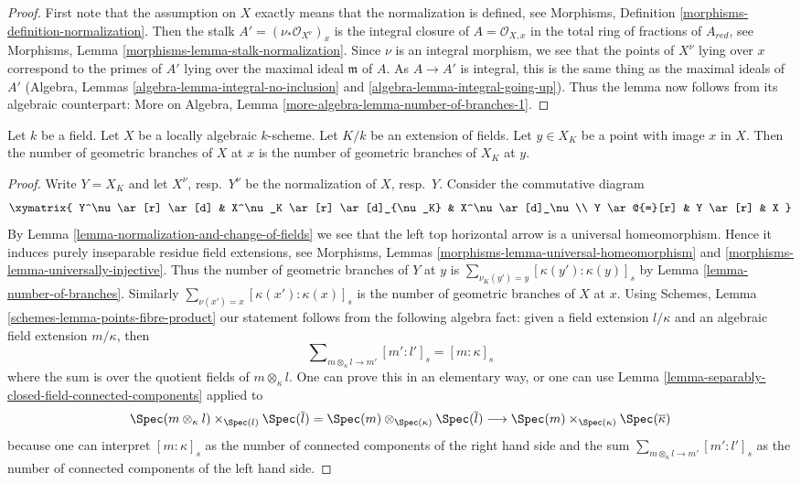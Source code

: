 \begin{proof}
First note that the assumption on $X$ exactly means that the
normalization is defined, see
Morphisms, Definition \ref{morphisms-definition-normalization}.
Then the stalk $A' = (\nu_*\mathcal{O}_{X^\nu})_x$ is the
integral closure of $A = \mathcal{O}_{X, x}$ in the total
ring of fractions of $A_{red}$, see
Morphisms, Lemma \ref{morphisms-lemma-stalk-normalization}.
Since $\nu$ is an integral morphism, we see that
the points of $X^\nu$ lying over $x$ correspond
to the primes of $A'$ lying over the maximal ideal $\mathfrak m$
of $A$. As $A \to A'$ is integral, this is the same thing as
the maximal ideals of $A'$
(Algebra, Lemmas \ref{algebra-lemma-integral-no-inclusion} and
\ref{algebra-lemma-integral-going-up}).
Thus the lemma now follows
from its algebraic counterpart:
More on Algebra, Lemma \ref{more-algebra-lemma-number-of-branches-1}.
\end{proof}

\begin{lemma}
\label{lemma-geometric-branches-and-change-of-fields}
Let $k$ be a field. Let $X$ be a locally algebraic $k$-scheme.
Let $K/k$ be an extension of fields. Let $y \in X_K$ be a
point with image $x$ in $X$. Then the number of
geometric branches of $X$ at $x$ is the number of geometric
branches of $X_K$ at $y$.
\end{lemma}

\begin{proof}
Write $Y = X_K$ and let $X^\nu$, resp.\ $Y^\nu$ be the normalization
of $X$, resp.\ $Y$. Consider the commutative diagram
$$
\xymatrix{
Y^\nu \ar[r] \ar[d] & X^\nu_K \ar[r] \ar[d]_{\nu_K} & X^\nu \ar[d]_\nu \\
Y \ar@{=}[r] & Y \ar[r] & X
}
$$
By Lemma \ref{lemma-normalization-and-change-of-fields} we see that
the left top horizontal arrow is a universal homeomorphism.
Hence it induces purely inseparable residue field extensions, see
Morphisms, Lemmas \ref{morphisms-lemma-universal-homeomorphism} and
\ref{morphisms-lemma-universally-injective}.
Thus the number of geometric branches of $Y$ at $y$ is
$\sum_{\nu_K(y') = y} [\kappa(y') : \kappa(y)]_s$
by Lemma \ref{lemma-number-of-branches}. Similarly
$\sum_{\nu(x') = x} [\kappa(x') : \kappa(x)]_s$ is the number of
geometric branches of $X$ at $x$. Using Schemes, Lemma
\ref{schemes-lemma-points-fibre-product}
our statement follows from the following algebra fact:
given a field extension $l/\kappa$ and
an algebraic field extension $m/\kappa$, then
$$
\sum\nolimits_{m \otimes_\kappa l \to m'} [m' : l']_s = [m : \kappa]_s
$$
where the sum is over the quotient fields of $m \otimes_\kappa l$.
One can prove this in an elementary way, or one can use
Lemma \ref{lemma-separably-closed-field-connected-components}
applied to
$$
\Spec(m \otimes_\kappa l) \times_{\Spec(l)} \Spec(\overline{l}) =
\Spec(m) \otimes_{\Spec(\kappa)} \Spec(\overline{l})
\longrightarrow
\Spec(m) \times_{\Spec(\kappa)} \Spec(\overline{\kappa})
$$
because one can interpret $[m : \kappa]_s$ as the number of
connected components of the right hand side and the sum
$\sum_{m \otimes_\kappa l \to m'} [m' : l']_s$
as the number of connected components of the left hand side.
\end{proof}

